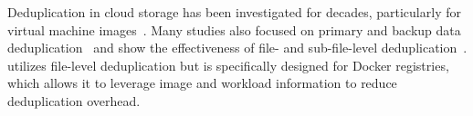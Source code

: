 %
%
%
%
%
%
%

Deduplication in cloud storage has been investigated for decades, particularly for virtual machine
images~\cite{zhou2013characterizing,srinivasan2012idedup,jin2009effectiveness, jayaram2011empirical}.
%
Many studies also focused on primary and backup data
deduplication~\cite{tarasov2014dmdedup,muthitacharoen2001low,lu2012insights,2009-sparse_indexing_inline_dedup_using_sampling-fast,2013-charact_increment_changes_data_protect-atc,wallace2012characteristics,zhu2008avoiding, lillibridge2013improving,
	fu2014accelerating,fu2015design,fu2011aa}
and show the effectiveness of file- and sub-file-level
deduplication~\cite{2012-hpc_practical_dedup_study-sc,msst16dedup-study}.
%
\sysname utilizes file-level deduplication but is specifically designed for Docker registries,
which allows it to leverage image and workload information to reduce deduplication overhead.
%


